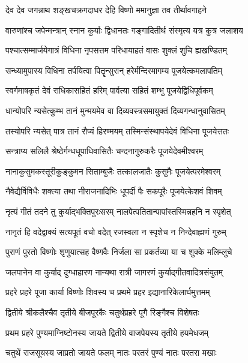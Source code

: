 \twolineshloka
{देव देव जगन्नाथ शङ्खचक्रगदाधर}
{देहि विष्णो ममानुज्ञा तव तीर्थावगाहने} %

\twolineshloka
{वारुणांश्च जपेन्मन्त्रान् स्नान कुर्याः द्विधानतः}
{गङ्गादितीर्थ संस्मृत्य यत्र कुत्र जलाशय} %

\twolineshloka
{पश्चात्सम्मार्जयेगात्रं विधिना नृपसत्तम}
{परिधायाहतं वासः शुक्लं शुचि ह्यखण्डितम्} %

\twolineshloka
{सन्ध्यामुपास्य विधिना तर्पयित्वा पितॄन्सुरान्}
{हरेर्मन्दिरमागम्य पूजयेत्कमलापतिम्} %

\twolineshloka
{स्वर्गमाषकृतं देवं राधिकासहितं हरिम्}
{पार्वत्या सहितं शम्भु पूजयेद्विधिपूर्वकम्} %

\twolineshloka
{धान्योपरि न्यसेत्कुम्भ तानं मुन्मयमेव वा}
{दिव्यवस्त्रसमायुक्तं दिव्यगन्धानुवासितम्} %

\twolineshloka
{तस्योपरि न्यसेत् पात्र तानं रौप्यं हिरण्मयम्}
{तस्मिन्संस्थापयेदेवं विधिना पूजयेत्ततः} %

\twolineshloka
{सन्त्राप्य सलिलै श्रेष्ठेर्गन्धधूपाधिवासितैः}
{चन्दनागुरुकरैः पूजयेदेवमीश्वरम्} %

\twolineshloka
{नानाकुसुमकस्तूरीकुङ्कुमन सिताम्बुजैः}
{तत्कालजातैः कुसुमैः पूजयेत्परमेश्वरम्} %

\twolineshloka
{नैवेद्यैर्विविधैः शक्त्या तथा नीराजनादिभिः}
{धूपर्दी पैः सकपूरैः पूजयेत्केशवं शिवम्} %

\twolineshloka
{नृत्यं गीतं तदने तु कुर्याद्भक्तिपुरःसरम्}
{नालपेत्पतितान्पापांस्तस्मिन्नहनि न स्पृशेत्} %

\twolineshloka
{नानृतं हि वदेद्वाक्यं सत्यपूतं वचो वदेत्}
{रजस्वला न स्पृशेच न निन्देवाह्मणं गुरुम्} %

\twolineshloka
{पुराणं पुरतो विष्णोः शृणुयात्सह वैष्णवैः}
{निर्जला सा प्रकर्तव्या या च शुक्के मलिम्लुचे} %

\twolineshloka
{जलपानेन वा कुर्याद् दुग्धाहारण नान्यथा}
{रात्री जागरणं कुर्याद्गीतवादित्रसंयुतम्} %

\twolineshloka
{प्रहरे प्रहरे पूजा कार्या विष्णोः शिवस्य च}
{प्रथमे प्रहर इद्यानारिकेलार्घमुत्तमम्} %

\twolineshloka
{द्वितीये श्रीकलैश्चैव तृतीये बीजपूरकैः}
{चतुर्थप्रहरे पूगै रिङ्गैश्च विशेषतः} %

\twolineshloka
{प्रथम प्रहरे पुण्यमाग्निष्टोनस्य जायते}
{द्वितीये वाजपेयस्य तृतीये हयमेधजम्} %

\twolineshloka
{चतुथें राजसूयस्य जाप्रतो जायते फलम्}
{नातः परतरं पुण्यं नातः परतरा मखाः} %


